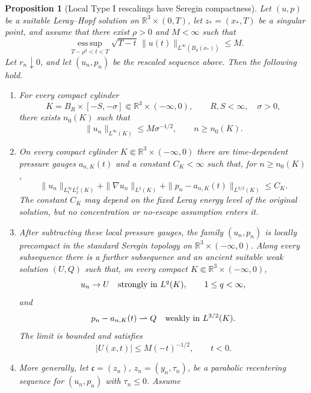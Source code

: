 \documentclass[11pt]{amsart}
\numberwithin{equation}{section}
\theoremstyle{plain}
\newtheorem{proposition}[theorem]{Proposition}
\theoremstyle{definition}
\theoremstyle{remark}
\newcommand{\R}{\mathbb R}
\newcommand{\esssup}{\operatorname*{ess\,sup}}
\begin{document}
\begin{proposition}[Local Type I rescalings have Seregin compactness]
\label{prop:local-typeI-terminal-compactness}
Let \((u,p)\) be a suitable Leray--Hopf solution on
\(\R^3\times(0,T)\), let \(z_*=(x_*,T)\) be a singular point, and assume that
there exist \(\rho>0\) and \(M<\infty\) such that
\begin{equation}\label{eq:local-typeI-bridge-bound}
   \esssup_{T-\rho^2<t<T}
   \sqrt{T-t}\,\|u(t)\|_{L^\infty(B_\rho(x_*))}\le M .
\end{equation}
Let \(r_n\downarrow0\), and let \((u_n,p_n)\) be the rescaled sequence above.
Then the following hold.
\begin{enumerate}[label=\textup{(\roman*)}]
\item For every compact cylinder
\[
   K=B_R\times[-S,-\sigma]\Subset\R^3\times(-\infty,0),
   \qquad R,S<\infty,\quad \sigma>0,
\]
there exists \(n_0(K)\) such that
\begin{equation}\label{eq:local-typeI-bridge-unifLinfty}
   \|u_n\|_{L^\infty(K)}\le M\sigma^{-1/2},
   \qquad n\ge n_0(K).
\end{equation}
\item On every compact cylinder \(K\Subset\R^3\times(-\infty,0)\) there are
time-dependent pressure gauges \(a_{n,K}(t)\) and a constant \(C_K<\infty\)
such that, for \(n\ge n_0(K)\),
\begin{equation}\label{eq:local-typeI-bridge-local-bounds}
   \|u_n\|_{L^\infty_tL^2_x(K)}
   +\|\nabla u_n\|_{L^2(K)}
   +\|p_n-a_{n,K}(t)\|_{L^{3/2}(K)}
   \le C_K .
\end{equation}
The constant \(C_K\) may depend on the fixed Leray energy level of the original
solution, but no concentration or no-escape assumption enters it.
\item After subtracting these local pressure gauges, the family
\((u_n,p_n)\) is locally precompact in the standard Seregin topology on
\(\R^3\times(-\infty,0)\).  Along every subsequence there is a further
subsequence and an ancient suitable weak solution \((U,Q)\) such that, on
every compact \(K\Subset\R^3\times(-\infty,0)\),
\[
   u_n\to U\quad\hbox{strongly in }L^q(K),\qquad 1\le q<\infty,
\]
and
\[
   p_n-a_{n,K}(t)\rightharpoonup Q
   \quad\hbox{weakly in }L^{3/2}(K).
\]
The limit is bounded and satisfies
\[
   |U(x,t)|\le M(-t)^{-1/2},\qquad t<0.
\]
\item More generally, let \(\mathfrak c=(z_n)\), \(z_n=(y_n,\tau_n)\), be a
parabolic recentering sequence for \((u_n,p_n)\) with \(\tau_n\le0\).  Assume

\end{enumerate}
\end{proposition}
\end{document}
